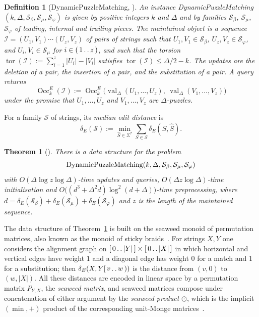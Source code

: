 \documentclass[10pt]{article}
\newtheorem{definition}{Definition}
\newtheorem{theorem}{Theorem}
\newcommand{\dE}{\delta_E}
\newcommand{\Occ}{\operatorname{Occ}^E}
\newcommand{\DPM}{\textnormal{Dynamic\hspace{0pt}Puzzle\hspace{0pt}Matching}}
\newcommand{\val}{\operatorname{val}}
\begin{document}
\begin{definition}[\DPM{}, {\cite[Section 1.3]{CKW22}}]\label{def:dpm}
An instance \DPM$(k,\Delta,\mathcal S_\beta,\mathcal S_\mu,\mathcal S_\varphi)$
is given by positive integers $k$ and $\Delta$ and by families
$\mathcal S_\beta$, $\mathcal S_\mu$, $\mathcal S_\varphi$ of \emph{leading},
\emph{internal} and \emph{trailing} pieces. The maintained object is a
sequence $\mathcal I=(U_1,V_1)\cdots(U_z,V_z)$ of pairs of strings such that
$U_1,V_1\in\mathcal S_\beta$, $U_z,V_z\in\mathcal S_\varphi$, and
$U_i,V_i\in\mathcal S_\mu$ for $i\in(\,1\mathinner{.\,.}z\,)$, and such that the
\emph{torsion} $\operatorname{tor}(\mathcal I):=\sum_{i=1}^{z}|U_i|-|V_i|$
satisfies $\operatorname{tor}(\mathcal I)\le\Delta/2-k$. The updates are the
deletion of a pair, the insertion of a pair, and the substitution of a pair.
A query returns
\[
\Occ_k(\mathcal I):=\Occ_k\bigl(\val_\Delta(U_1,\ldots,U_z),\
\val_\Delta(V_1,\ldots,V_z)\bigr)
\]
under the promise that $U_1,\ldots,U_z$ and $V_1,\ldots,V_z$ are
$\Delta$-puzzles.
\end{definition}

For a family $\mathcal S$ of strings, its \emph{median edit distance} is
\[
\dE(\mathcal S):=\min_{\hat S\in\Sigma^*}\sum_{S\in\mathcal S}\dE(S,\hat S).
\]

\begin{theorem}[{\cite[Theorem 1.5]{CKW22}}]\label{thm:dpm}
There is a data structure for the problem
\[
\DPM(k,\Delta,\mathcal S_\beta,\mathcal S_\mu,\mathcal S_\varphi)
\]
with $O(\Delta\log z\log\Delta)$-time updates and queries,
$O(\Delta z\log\Delta)$-time initialisation and
$O\bigl((d^3+\Delta^2d)\log^2(d+\Delta)\bigr)$-time preprocessing, where
$d=\dE(\mathcal S_\beta)+\dE(\mathcal S_\mu)+\dE(\mathcal S_\varphi)$ and $z$
is the length of the maintained sequence.
\end{theorem}

The data structure of Theorem~\ref{thm:dpm} is built on the seaweed monoid of
permutation matrices, also known as the monoid of sticky
braids~\cite{Tiskin08,Tiskin15,TiskinArXiv}. For strings $X,Y$ one considers
the alignment graph on $[\,0\mathinner{.\,.}|Y|\,]\times[\,0\mathinner{.\,.}|X|\,]$ in which horizontal
and vertical edges have weight $1$ and a diagonal edge has weight $0$ for a
match and $1$ for a substitution; then $\dE(X,Y[\,v\mathinner{.\,.}w\,))$ is the distance
from $(v,0)$ to $(w,|X|)$. All these distances are encoded in linear space by a
permutation matrix $P_{Y,X}$, the \emph{seaweed matrix}, and seaweed matrices
compose under concatenation of either argument by the \emph{seaweed product}
$\odot$, which is the implicit $(\min,+)$ product of the corresponding
unit-Monge matrices~\cite[Lemma 9.2]{CKW22}.
\end{document}

